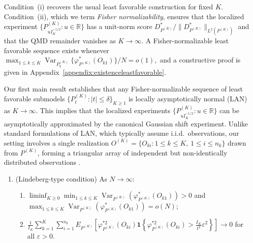 \documentclass[11pt]{article}
\theoremstyle{plain}
\theoremstyle{definition}
\theoremstyle{remark}
\theoremstyle{definition}
\begin{document}
Condition~(i) recovers the usual least favorable construction for fixed
\(K\). Condition~(ii), which we term \emph{Fisher normalizability}, ensures that
the localized experiment \(\{P_{u I_K^{-1/2}}^{(K)} : u \in \mathbb{R}\}\) has a
unit-norm score \(D_{P^{(K)}}^*/\|D_{P^{(K)}}^*\|_{L^2(P^{(K)})}\) and that the
QMD remainder vanishes as \(K \to \infty\). A
Fisher-normalizable least favorable sequence exists whenever $\max_{1 \le k \le K}
\operatorname{Var}_{P_k^{(K)}}\{\varphi_{P^{(K)}}^*(O_{k1})\}/N = o(1),$
and a constructive proof is given in
Appendix~\ref{appendix:existenceleastfavorable}.


Our first main result establishes that any Fisher-normalizable sequence of least
favorable submodels \( \{P_t^{(K)} : |t| \le \delta\}_{K \ge 1} \) is locally
asymptotically normal (LAN) as \(K \to \infty\). This implies that the localized
experiments \( \{P_{u I_K^{-1/2}}^{(K)} : u \in \mathbb{R}\} \) can be
asymptotically approximated by the canonical Gaussian shift experiment. Unlike
standard formulations of LAN, which typically assume i.i.d.\ observations, our
setting involves a single realization
\(O^{(K)} = \{O_{ki} : 1 \le k \le K,\ 1 \le i \le n_k\}\) drawn from
\(P^{(K)}\), forming a triangular array of independent but non-identically
distributed observations
\citep{lecam1960locally, le1972limits, lecam2012asymptotic}.


\begin{enumerate}[label=\textbf{F\arabic*)}, ref=F\arabic*, resume=eff]
    \item \label{cond::efflindeburg} {(Lindeberg-type condition)}  
    As \( N \to \infty \):
    \begin{enumerate}
        \item \(\liminf_{K \ge 0}\min_{1 \le k \le K} \operatorname{Var}_{P^{(K)}}\!\left(\varphi_{P^{(K)}}^*(O_{k1})\right) > 0\) and \(\max_{1 \le k \le K} \operatorname{Var}_{P^{(K)}}\!\left(\varphi_{P^{(K)}}^*(O_{k1})\right) = o(N)\);
        \item \(\tfrac{1}{I_K} \sum_{k=1}^K \sum_{i=1}^{n_k} 
        E_{P^{(K)}}\!\left[ \varphi_{P^{(K)}}^{*2}(O_{ki}) 
        \mathbf{1}\!\left\{ \varphi_{P^{(K)}}^{*2}(O_{ki}) > \tfrac{I_K}{t^2}\varepsilon^2 \right\} \right] \to 0\) for all \(\varepsilon > 0\).
    \end{enumerate} 
\end{enumerate}
\end{document}
